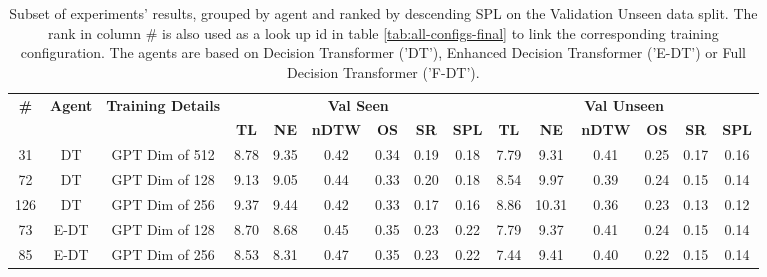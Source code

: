 \begin{table}
\centering
\caption{\label{tab:dim_test}Subset of experiments' results, grouped by agent and ranked by descending SPL on the Validation Unseen data split. The rank in column \# is also used as a look up id in table \ref{tab:all-configs-final} to link the corresponding training configuration.     \newline The agents are based on Decision Transformer ('DT'), Enhanced Decision Transformer ('E-DT') or Full Decision Transformer ('F-DT').}
\begin{tabular}{@{\hskip3pt}c@{\hskip3pt}c@{\hskip3pt}c@{\hskip3pt}c@{\hskip3pt}c@{\hskip3pt}c@{\hskip3pt}c@{\hskip3pt}c@{\hskip3pt}c@{\hskip3pt}c@{\hskip3pt}c@{\hskip3pt}c@{\hskip3pt}c@{\hskip3pt}c@{\hskip3pt}c}
\toprule
\textbf{\#} & \textbf{Agent} & \textbf{Training Details} & \multicolumn{6}{c}{\textbf{Val Seen}} & \multicolumn{6}{c}{\textbf{Val Unseen}} \\
 \textbf{~} &     \textbf{~} &                \textbf{~} &       \textbf{TL} & \textbf{NE} & \textbf{nDTW} & \textbf{OS} & \textbf{SR} & \textbf{SPL} &         \textbf{TL} & \textbf{NE} & \textbf{nDTW} & \textbf{OS} & \textbf{SR} & \textbf{SPL} \\
\midrule
         31 &             DT &            GPT Dim of 512 &              8.78 &        9.35 &          0.42 &        0.34 &        0.19 &         0.18 &                7.79 &        9.31 &          0.41 &        0.25 &        0.17 &         0.16 \\
         72 &             DT &            GPT Dim of 128 &              9.13 &        9.05 &          0.44 &        0.33 &        0.20 &         0.18 &                8.54 &        9.97 &          0.39 &        0.24 &        0.15 &         0.14 \\
        126 &             DT &            GPT Dim of 256 &              9.37 &        9.44 &          0.42 &        0.33 &        0.17 &         0.16 &                8.86 &       10.31 &          0.36 &        0.23 &        0.13 &         0.12 \\
         73 &           E-DT &            GPT Dim of 128 &              8.70 &        8.68 &          0.45 &        0.35 &        0.23 &         0.22 &                7.79 &        9.37 &          0.41 &        0.24 &        0.15 &         0.14 \\
         85 &           E-DT &            GPT Dim of 256 &              8.53 &        8.31 &          0.47 &        0.35 &        0.23 &         0.22 &                7.44 &        9.41 &          0.40 &        0.22 &        0.15 &         0.14 \\

\end{tabular}
\end{table}
